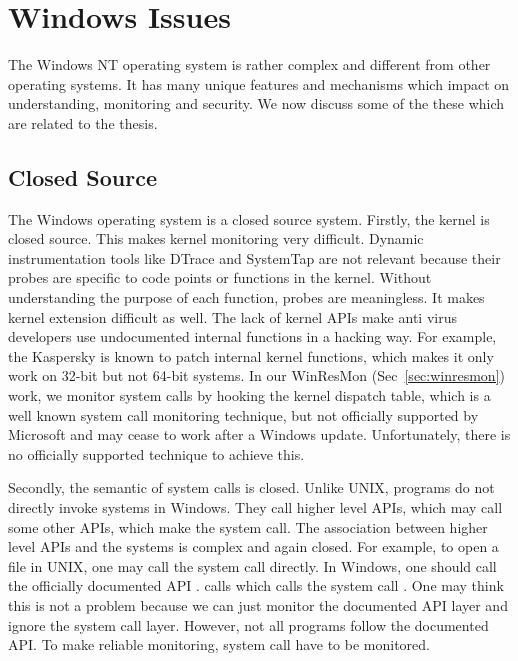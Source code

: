 \section{Windows Issues}
\label{sec:bg-win}

The Windows NT operating system is rather complex and different from other
operating systems.
It has many unique features and mechanisms which impact on understanding,
monitoring and security.
We now discuss some of the these which are related to the thesis.

\subsection{Closed Source}

The Windows operating system is a closed source system.
Firstly, the kernel is closed source.
This makes kernel monitoring very difficult.
Dynamic instrumentation tools like DTrace and SystemTap are not relevant because
their probes are specific to code points or functions in the kernel.
Without understanding the purpose of each function, probes are meaningless.
It makes kernel extension difficult as well.
The lack of kernel APIs make anti virus developers use undocumented internal
functions in a hacking way.
For example, the Kaspersky is known \cite{skywing2006avwrong} to patch internal
kernel functions, which makes it only work on 32-bit but not 64-bit systems.
In our WinResMon (Sec~\ref{sec:winresmon}) work, we monitor system calls
by hooking the kernel dispatch table, which is a well known
system call monitoring technique,
but not officially supported by Microsoft and may cease to work
after a Windows update.
Unfortunately, there is no officially supported technique to achieve this.

Secondly, the semantic of system calls is closed.
Unlike UNIX, programs do not directly invoke systems in Windows.
They call higher level APIs, which may call some other APIs, which make
the system call.
The association between higher level APIs and the systems is complex and
again closed.
For example, to open a file in UNIX, one may call the 
system call directly.
In Windows, one should call the officially documented API .
 calls  which calls
the system call .
One may think this is not a problem because we can just monitor the documented
API layer and ignore the system call layer.
However, not all programs follow the documented API.
To make reliable monitoring, system call have to be monitored.

